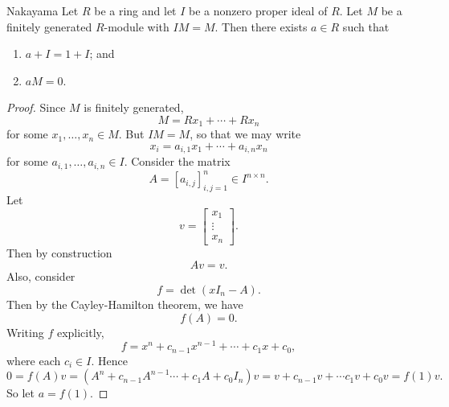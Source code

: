 \documentclass[pmath441]{subfiles}
\begin{document}
    \clearpage
    
    \begin{lemma}{Nakayama}
        Let $R$ be a ring and let $I$ be a nonzero proper ideal of $R$. Let $M$ be a finitely generated $R$-module with $IM=M$. Then there exists $a\in R$ such that
        \begin{enumerate}
            \item $a+I=1+I$; and
            \item $aM = 0$.
        \end{enumerate}
    \end{lemma}

    \begin{proof}
        Since $M$ is finitely generated,
        \begin{equation*}
            M = Rx_1 + \cdots + Rx_n
        \end{equation*}
        for some $x_1,\ldots,x_n\in M$. But $IM = M$, so that we may write
        \begin{equation*}
            x_i = a_{i,1}x_1 + \cdots + a_{i,n}x_n
        \end{equation*}
        for some $a_{i,1},\ldots,a_{i,n}\in I$. Consider the matrix
        \begin{equation*}
            A = \left[ a_{i,j} \right]^n_{i,j=1}\in I^{n\times n}.
        \end{equation*}
        Let
        \begin{equation*}
            v = \begin{bmatrix} x_1 \\ \vdots \\ x_n \end{bmatrix}.
        \end{equation*}
        Then by construction
        \begin{equation*}
            Av=v.
        \end{equation*}
        Also, consider
        \begin{equation*}
            f = \det\left( xI_n-A \right).
        \end{equation*}
        Then by the Cayley-Hamilton theorem, we have
        \begin{equation*}
            f\left( A \right) = 0.
        \end{equation*}
        Writing $f$ explicitly,
        \begin{equation*}
            f = x^n + c_{n-1}x^{n-1} + \cdots + c_1x + c_0,
        \end{equation*}
        where each $c_i\in I$. Hence
        \begin{equation*}
            0 = f\left( A \right)v = \left( A^n+c_{n-1}A^{n-1}\cdots+c_1A+c_0I_n \right)v = v + c_{n-1}v + \cdots c_1v + c_0v = f\left( 1 \right)v.
        \end{equation*}
        So let $a = f\left( 1 \right)$.


\end{proof}
\end{document}
